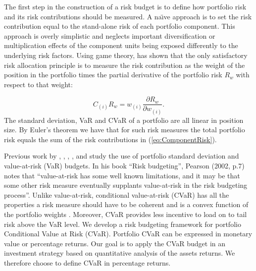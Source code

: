\documentclass[12pt,a4paper]{article}
\begin{document}
The first step in the construction of a risk budget is to define how portfolio risk and its risk contributions should be measured. A na\"{\i}ve approach is to set the risk contribution equal to the stand-alone risk of each portfolio component. This approach is overly simplistic and neglects important diversification or multiplication effects of the component units being exposed differently to the underlying risk factors. Using game theory, \citet{Denault2001} has shown that the only satisfactory risk allocation principle is to measure the risk contribution as the weight of the position in the portfolio times the partial derivative of the portfolio risk  $R_w$ with respect to that weight:

\begin{equation}  C_{(i)}R_w = w_{(i)}\frac{\partial R_w}{\partial w_{(i)}}. \label{eq:ComponentRisk}\end{equation}
The standard deviation, VaR and CVaR of a portfolio are all linear in position size. By Euler's theorem we have that for such risk measures the total portfolio risk equals the sum of the risk contributions in (\ref{eq:ComponentRisk}).


Previous work by \citet{Chow2001}, \citet{Litterman1996}, \citet{Maillard2010}, \citet{Peterson2008}, and \citet{Scherer2007} study the use of portfolio standard deviation and value-at-risk (VaR) budgets. In his book ``Risk budgeting'', \nocite{Pearson2002} Pearson (2002, p.7) notes that ``value-at-risk has some well known limitations, and it may be that some other risk measure eventually supplants value-at-risk in the risk budgeting process''. Unlike value-at-risk, conditional value-at-risk (CVaR) has all the properties a risk measure should have to be coherent and is a convex function of the portfolio weights \citep{Artzner1999, Pflug2000}. Moreover, CVaR provides less incentive to load on to tail risk above the VaR level.
We develop a risk budgeting framework for portfolio Conditional Value at Risk (CVaR). Portfolio CVaR can be expressed in monetary value or percentage returns. Our goal is to apply the CVaR budget in an investment strategy based on quantitative analysis of the assets returns. We therefore choose to define CVaR in percentage returns.
\end{document}
